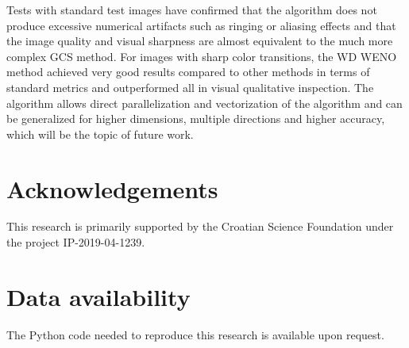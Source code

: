 Tests with standard test images have confirmed that the algorithm does not produce excessive numerical artifacts such as ringing or aliasing effects and that the image quality and visual sharpness are almost equivalent to the much more complex GCS method.
For images with sharp color transitions, the {WD} WENO method achieved very good results compared to other methods in terms of standard metrics and outperformed all in visual qualitative inspection. The algorithm allows direct parallelization and vectorization of the algorithm and can be generalized for higher dimensions, multiple directions and higher accuracy, which will be the topic of future work.

\section*{Acknowledgements}
This research is primarily supported by the Croatian Science Foundation under the project IP-2019-04-1239.
\section*{Data availability}
The Python code needed to reproduce this research is available upon request.


	 
	

